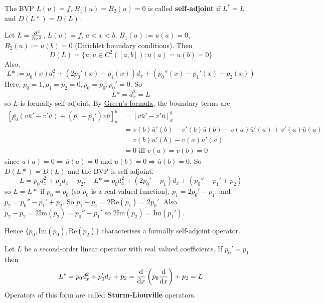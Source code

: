 \begin{definition}
	The BVP $L(u) = f$, $B_1(u) = B_2(u) = 0$ is called \textbf{self-adjoint} if $L^* = L$ and $D(L*) = D(L)$.
\end{definition}

\begin{example}
	Let $L = \diffp[2]{}{x}$, $L(u) = f$, $a < x < b$, $B_1(u) := u(a) = 0$, $B_2(u) := u(b) = 0$ (Dirichlet boundary conditions). Then
	\[
		D(L) = \{ u: u \in C^2 ([a, b]): u(a) = u(b) = 0 \}
	\]
	Also,
	\[
		L* := \overline{p_0} (x) d_x^2 + (2 \overline{p_0}'(x) - \overline{p_1}(x)) d_x + (\overline{p_0}''(x) - \overline{p_1}'(x) + \overline{p_2}(x))
	\]
	Here, $p_0 = 1, p_1 = p_2 = 0, \overline{p_0} = p_0, p_0' = 0$. So
	\[
		L* = d_x^2 = L
	\]
	so $L$ is formally self-adjoint. By \hyperref[prop:greensFormula]{Green's formula}, the boundary terms are
	\[
		\begin{aligned}
			{\left[ \overline{p_0} (v \overline{u}' - v' \overline{u}) + (\overline{p_1} - \overline{p_0}') v \overline{u} \right]}_a^b 
				& = {\left[ v \overline{u}' - v' \overline{u} \right]}_a^b \\
				& = v(b) \overline{u}'(b) - v'(b) \overline{u}(b) - v(a) \overline{u}'(a) + v'(a) \overline{u}(a) \\
				& = v(b) \overline{u}'(b) - v(a) \overline{u}'(a) \\
				& = 0 \text{ iff } v(a) = v(b) = 0
		\end{aligned}
	\]
	since $u(a) = 0 \Longrightarrow \overline{u}(a) = 0$ and $u(b) = 0 \Longrightarrow \overline{u}(b) = 0$. So $D(L*) = D(L)$ and the BVP is self-adjoint.
	\[
		L = p_0 d_x^2 + p_1 d_x + p_2, \quad L* = \overline{p_0} d_x^2 + (2 \overline{p_0}' - \overline{p_1}) d_x + (\overline{p_0}'' - \overline{p_1}' + \overline{p_2})
	\]
	so $L = L*$ if $p_0 = \overline{p_0}$ (so $p_0$ is a real-valued function), $p_1 = 2 \overline{p_0}' - \overline{p_1}$, and $p_2 = \overline{p_0}'' - \overline{p_1}' + \overline{p_2}$. So $p_1 + \overline{p_1} = 2 \text{Re} (p_1) = 2 p_0'$. Also $p_2 - \overline{p_2} = 2 \text{Im}(p_2) = p_0'' - \overline{p_1}'$ so $2 \text{Im}(p_2) = \text{Im}(p_1')$.

	Hence $\{ p_0, \text{Im}(p_0), \text{Re}(p_2) \}$ characterises a formally self-adjoint operator.
\end{example}

\begin{definition}
	Let $L$ be a second-order linear operator with real valued coefficients. If $p_0' = p_1$ then
	\[
		L^* = p_0 d_x^2 + p_0' d_x + p_2 = \diff{}{x} \left( p_0 \diff{}{x} \right) + p_2 = L
	\]
	Operators of this form are called \textbf{Sturm-Liouville} operators.
\end{definition}

